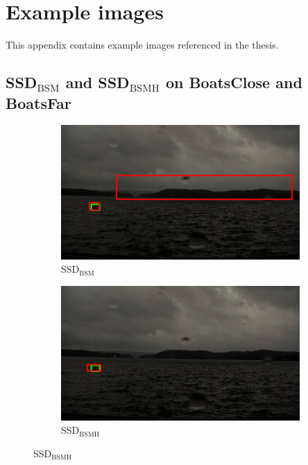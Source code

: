 
\chapter{Example images}
This appendix contains example images referenced in the thesis.


\newpage

\section{SSD$_{\text{BSM}}$ and SSD$_{\text{BSMH}}$ on BoatsClose and BoatsFar}
\label{sec:bigbox}

\begin{figure}[h!]
\begin{subfigure}{.5\textwidth}
  \centering
  \includegraphics[width=0.9\linewidth]{results/case_buildings/bigbox_bcbf/SSD2/selected_06_14_axis0049.jpg}
  \caption{SSD$_{\text{BSM}}$}
  \label{fig:sfig1}
\end{subfigure}%
\begin{subfigure}{.5\textwidth}
  \centering
  \includegraphics[width=.9\linewidth]{results/case_buildings/bigbox_bcbf/SSD3/selected_06_14_axis0049.jpg}
  \caption{SSD$_{\text{BSMH}}$}
  \label{fig:sfig2}
\end{subfigure}


\end{figure}
